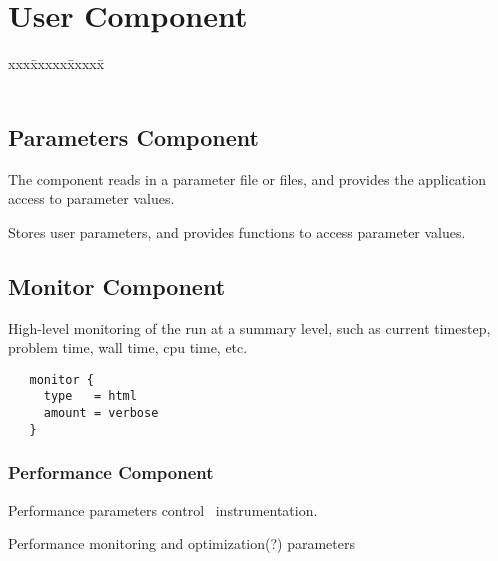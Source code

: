 \section{User Component} \label{s:component-user}

\begin{tabbing}
xxx\=xxxxx\=xxxxx\=\kill
\>  \\
\>  \\
\>\> 
\end{tabbing}

\subsection{Parameters Component} \label{ss:component-parameters}

The  component reads in a parameter file or files, and
provides the application access to parameter values.

        Stores user parameters, and provides functions to access
        parameter values.

\subsection{Monitor Component} \label{ss:component-monitor}

High-level monitoring of the run at a summary level, such as current
timestep, problem time, wall time, cpu time, etc.

\begin{verbatim}
   monitor {
     type   = html
     amount = verbose
   }
\end{verbatim}

\subsubsection{Performance Component} \label{ss:component-performance}

Performance parameters control \lcaperf\ instrumentation.

Performance monitoring and optimization(?) parameters

